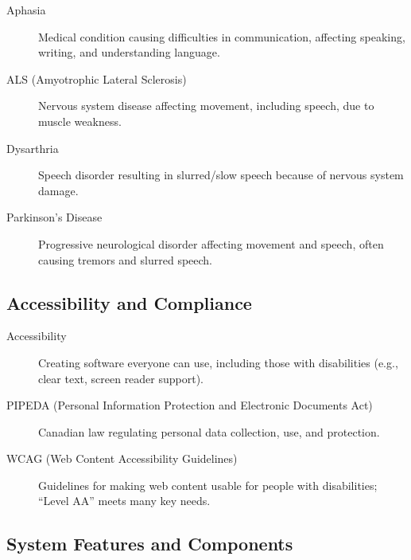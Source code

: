 \documentclass[11pt]{article}
\begin{document}
\begin{description}
  \item[Aphasia] Medical condition causing difficulties in communication, affecting speaking, writing, and understanding language.
  \item[ALS (Amyotrophic Lateral Sclerosis)] Nervous system disease affecting movement, including speech, due to muscle weakness.
  \item[Dysarthria] Speech disorder resulting in slurred/slow speech because of nervous system damage.
  \item[Parkinson’s Disease] Progressive neurological disorder affecting movement and speech, often causing tremors and slurred speech.
\end{description}

\subsection*{Accessibility and Compliance}

\begin{description}
  \item[Accessibility] Creating software everyone can use, including those with disabilities (e.g., clear text, screen reader support).
  \item[PIPEDA (Personal Information Protection and Electronic Documents Act)] Canadian law regulating personal data collection, use, and protection.
  \item[WCAG (Web Content Accessibility Guidelines)] Guidelines for making web content usable for people with disabilities; “Level AA” meets many key needs.
\end{description}

\subsection*{System Features and Components}
\end{document}
